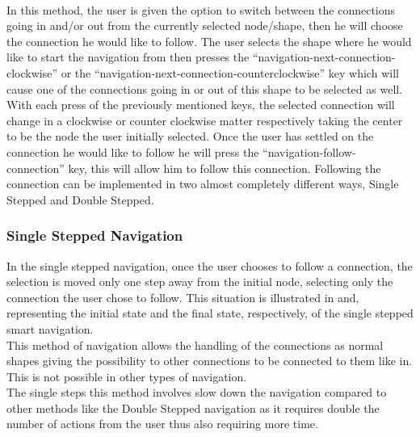 \paragraph{}
In this method, the user is given the option to switch between the connections going in and/or out from the currently selected node/shape, then he will choose the connection he would like to follow. The user selects the shape where he would like to start the navigation from then presses the ``navigation-next-connection-clockwise'' or the ``navigation-next-connection-counterclockwise'' key which will cause one of the connections going in or out of this shape to be selected as well. With each press of the previously mentioned keys, the selected connection will change in a clockwise or counter clockwise matter respectively taking the center to be the node the user initially selected. Once the user has settled on the connection he would like to follow he will press the ``navigation-follow-connection'' key, this will allow him to follow this connection. Following the connection can be implemented in two almost completely different ways, Single Stepped and Double Stepped.

\subsubsection {Single Stepped Navigation}
In the single stepped navigation, once the user chooses to follow a connection, the selection is moved only one step away from the initial node, selecting only the connection the user chose to follow. This situation is illustrated in and, representing the initial state and the final state, respectively, of the single stepped smart navigation.\\
This method of navigation allows the handling of the connections as normal shapes giving the possibility to other connections to be connected to them like in. This is not possible in other types of navigation.\\
The single steps this method involves slow down the navigation compared to other methods like the Double Stepped navigation as it requires double the number of actions from the user thus also requiring more time.


